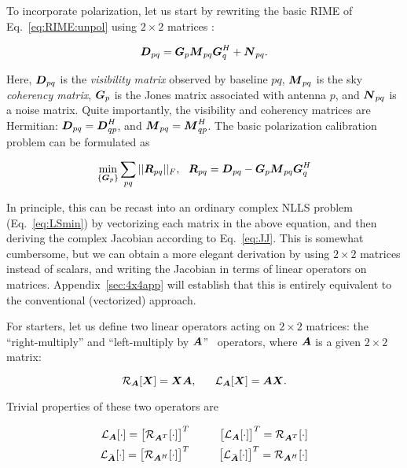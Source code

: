 \documentclass[useAMS,usenatbib]{mn2e}
\newcommand{\mat}[1]{{\bmath{#1}}}
\newcommand{\DD}{\mat{D}}
\newcommand{\MM}{\mat{M}}
\newcommand{\RR}{\mat{R}}
\newcommand{\GG}{\mat{G}}
\begin{document}
To incorporate polarization, let us start by rewriting the basic RIME of Eq.~\ref{eq:RIME:unpol} using $2\times 2$ matrices \citep[a full derivation
may be found in][]{RRIME1}:

\begin{equation}
\label{eq:RIME:pol}
\DD_{pq} = \GG_p \MM_{pq} \GG^H_q + \mat{N}_{pq}.
\end{equation}

Here, $\DD_{pq}$ is the \emph{visibility matrix} observed by baseline $pq$, $\MM_{pq}$ is the sky \emph{coherency matrix}, $\GG_p$ is the Jones matrix associated with antenna $p$, and $\mat{N}_{pq}$ is a noise matrix. Quite importantly, the visibility and coherency matrices are Hermitian: 
$\DD_{pq}=\DD^H_{qp}$, and $\MM_{pq}=\MM^H_{qp}$. The basic polarization calibration problem can be formulated as

\begin{equation}
\label{eq:cal:DI:pol}
\min_{\{\GG_p\}}\sum_{pq}||\RR_{pq}||_F,~~
\RR_{pq} = \DD_{pq}-\GG_p \MM_{pq} \GG^H_q
\end{equation}


\newcommand{\Rop}[1]{\mathcal{R}_{{#1}}}
\newcommand{\Lop}[1]{\mathcal{L}_{{#1}}}
\newcommand{\Top}{\mathcal{T}}

In principle, this can be recast into an ordinary complex NLLS problem (Eq.~\ref{eq:LSmin}) by vectorizing each matrix in the above equation, 
and then deriving the complex Jacobian according to Eq.~\ref{eq:JJ}. This is somewhat cumbersome, but we can obtain a more elegant derivation
by using $2\times2$ matrices instead of scalars, and writing the Jacobian in terms of linear operators on matrices. Appendix~\ref{sec:4x4app}
will establish that this is entirely equivalent to the conventional (vectorized) approach. 

For starters, let us define two linear operators acting on $2\times2$ matrices: the ``right-multiply'' and ``left-multiply by $\mat{A}$'' \
operators, where $\mat{A}$ is a given $2\times2$ matrix:

\begin{equation}
\label{eq:def::RL}
\Rop{\mat{A}} [\mat{X}] = \mat{XA}, ~~~~~
\Lop{\mat{A}} [\mat{X}] = \mat{AX}.
\end{equation}

Trivial properties of these two operators are 

\begin{eqnarray}
\label{eq:LA:RATT}
\Lop{\mat{A}}[\cdot] = \big[ \Rop{\mat{A}^T}[\cdot] \big ]^T~~&~&~~
\big[ \Lop{\mat{A}}[\cdot] \big]^T = \Rop{\mat{A}^T}[\cdot] \nonumber\\
\Lop{\bar{\mat{A}}}[\cdot] = \big[ \Rop{\mat{A}^H}[\cdot] \big ]^T~~&~&~~
\big[ \Lop{\bar{\mat{A}}}[\cdot] \big]^T = \Rop{\mat{A}^H}[\cdot]
\end{eqnarray}
\end{document}
